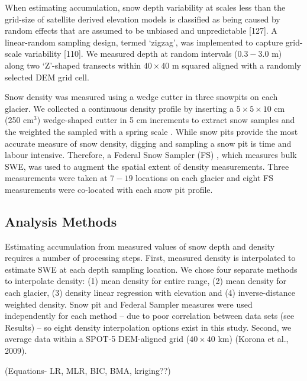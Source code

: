 \documentclass[twoside,twocolumn]{article}
\begin{document}
When estimating accumulation, snow depth variability at scales less than the grid-size of satellite derived elevation models is classified as being caused by random effects that are assumed to be unbiased and unpredictable [127]. A linear-random sampling design, termed `zigzag', was implemented to capture grid-scale variability [110]. We measured depth at random intervals ($0.3 - 3.0$ m) along two `Z'-shaped transects within $40\times40$ m squared aligned with a randomly selected DEM grid cell.

Snow density was measured using a wedge cutter in three snowpits on each glacier. We collected a continuous density profile by inserting a $5\times5\times 10$ cm (250 cm$^3$) wedge-shaped cutter in 5 cm increments to extract snow samples and the weighted the sampled with a spring scale \citep{Gray1981,Firez2009}. While snow pits provide the most accurate measure of snow density, digging and sampling a snow pit is time and labour intensive. Therefore, a Federal Snow Sampler (FS) \citep{Clyde1932}, which measures bulk SWE, was used to augment the spatial extent of density measurements. Three measurements were taken at $7-19$ locations on each glacier and eight FS measurements were co-located with each snow pit profile.

\subsection{Analysis Methods}

Estimating accumulation from measured values of snow depth and density requires a number of processing steps. First, measured density is interpolated to estimate SWE at each depth sampling location. We chose four separate methods to interpolate density: (1) mean density for entire range, (2) mean density for each glacier, (3) density linear regression with elevation and (4) inverse-distance weighted density. Snow pit and Federal Sampler measures were used independently for each method -- due to poor correlation between data sets (see Results) -- so eight density interpolation options exist in this study. Second, we average data within a SPOT-5 DEM-aligned grid ($40\times40$ km) (Korona et al., 2009). 

(Equations- LR, MLR, BIC, BMA, kriging??)
\end{document}
